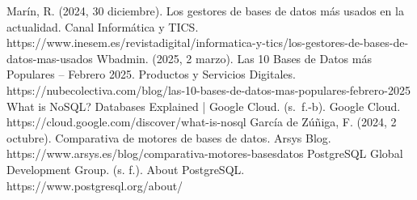 \documentclass[12pt]{report}
\begin{document}
\begin{thebibliography}{99}
        Marín, R. (2024, 30 diciembre). Los gestores de bases de datos más usados en la actualidad. Canal Informática y TICS. https://www.inesem.es/revistadigital/informatica-y-tics/los-gestores-de-bases-de-datos-mas-usados
        Wbadmin. (2025, 2 marzo). Las 10 Bases de Datos más Populares – Febrero 2025. Productos y Servicios Digitales. https://nubecolectiva.com/blog/las-10-bases-de-datos-mas-populares-febrero-2025
        What is NoSQL? Databases Explained | Google Cloud. (s. f.-b). Google Cloud. https://cloud.google.com/discover/what-is-nosql
        García de Zúñiga, F. (2024, 2 octubre). Comparativa de motores de bases de datos. Arsys Blog. https://www.arsys.es/blog/comparativa-motores-basesdatos
        PostgreSQL Global Development Group. (s. f.). About PostgreSQL. https://www.postgresql.org/about/
\end{thebibliography}
\end{document}
